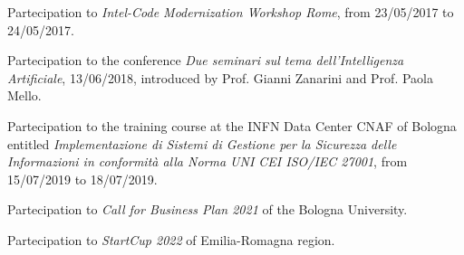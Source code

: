 {\begin{itemize}
     Partecipation to \emph{Intel-Code Modernization Workshop Rome}, from 23/05/2017 to 24/05/2017.

     Partecipation to the conference \emph{Due seminari sul tema dell'Intelligenza Artificiale}, 13/06/2018, introduced by Prof. Gianni Zanarini and Prof. Paola Mello.

     Partecipation to the training course at the INFN Data Center CNAF of Bologna entitled \emph{Implementazione di Sistemi di Gestione per la Sicurezza delle Informazioni in conformità alla Norma UNI CEI ISO/IEC 27001}, from 15/07/2019 to 18/07/2019.

     Partecipation to \emph{Call for Business Plan 2021} of the Bologna University.

     Partecipation to \emph{StartCup 2022} of Emilia-Romagna region.

  \end{itemize}

}
